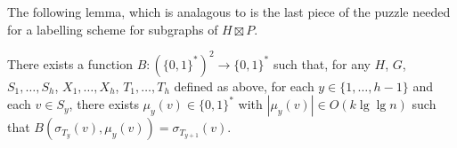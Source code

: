 \documentclass[kpfonts]{patmorin}
\let\le\leqslant
\begin{document}
% 
% 
% 
% 

The following lemma, which is analagous to  is the last piece of the puzzle needed for a labelling scheme for subgraphs of $H\boxtimes P$.

\begin{lem}
  There exists a function $B:(\{0,1\}^*)^2\to \{0,1\}^*$ such that, for any 
  $H$, $G$, $S_1,\ldots,S_h$, $X_1,\ldots,X_h$, $T_1,\ldots,T_h$ defined as above, for each $y\in\{1,\ldots,h-1\}$ and each $v\in S_y$, there exists $\mu_y(v)\in\{0,1\}^*$ with $|\mu_y(v)|\in O(k\lg\lg n)$ such that $B(\sigma_{T_y}(v), \mu_y(v))=\sigma_{T_{y+1}}(v)$.
\end{lem}
\end{document}
